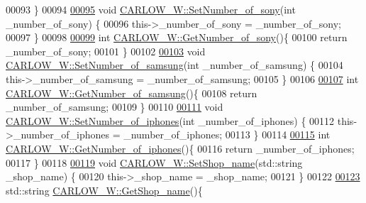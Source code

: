\begin{DoxyCode}
00093 \}
00094 
\hypertarget{_c_a_r_l_o_w___w_8cpp_source.tex_l00095}{}\hyperlink{class_c_a_r_l_o_w___w_ab255132fb2ef5678d00c74f90acdf2dd}{00095} \textcolor{keywordtype}{void} \hyperlink{class_c_a_r_l_o_w___w_ab255132fb2ef5678d00c74f90acdf2dd}{CARLOW\_W::SetNumber\_of\_sony}(\textcolor{keywordtype}{int} \_number\_of\_sony) \{
00096     this->\_number\_of\_sony = \_number\_of\_sony;
00097 \}
00098 
\hypertarget{_c_a_r_l_o_w___w_8cpp_source.tex_l00099}{}\hyperlink{class_c_a_r_l_o_w___w_a6d31219dac9b4d8842e14b7414ed286e}{00099} \textcolor{keywordtype}{int} \hyperlink{class_c_a_r_l_o_w___w_a6d31219dac9b4d8842e14b7414ed286e}{CARLOW\_W::GetNumber\_of\_sony}()\{
00100     \textcolor{keywordflow}{return} \_number\_of\_sony;
00101 \}
00102 
\hypertarget{_c_a_r_l_o_w___w_8cpp_source.tex_l00103}{}\hyperlink{class_c_a_r_l_o_w___w_a6e629d8043c4c4266ecafa9f6a3e6447}{00103} \textcolor{keywordtype}{void} \hyperlink{class_c_a_r_l_o_w___w_a6e629d8043c4c4266ecafa9f6a3e6447}{CARLOW\_W::SetNumber\_of\_samsung}(\textcolor{keywordtype}{int} \_number\_of\_samsung) \{
00104     this->\_number\_of\_samsung = \_number\_of\_samsung;
00105 \}
00106 
\hypertarget{_c_a_r_l_o_w___w_8cpp_source.tex_l00107}{}\hyperlink{class_c_a_r_l_o_w___w_aecc697b6d017d88f2bdbe3cea2bf3496}{00107} \textcolor{keywordtype}{int} \hyperlink{class_c_a_r_l_o_w___w_aecc697b6d017d88f2bdbe3cea2bf3496}{CARLOW\_W::GetNumber\_of\_samsung}()\{
00108     \textcolor{keywordflow}{return} \_number\_of\_samsung;
00109 \}
00110 
\hypertarget{_c_a_r_l_o_w___w_8cpp_source.tex_l00111}{}\hyperlink{class_c_a_r_l_o_w___w_ad58af9d68450f4fc70e0e1ecd4b1b498}{00111} \textcolor{keywordtype}{void} \hyperlink{class_c_a_r_l_o_w___w_ad58af9d68450f4fc70e0e1ecd4b1b498}{CARLOW\_W::SetNumber\_of\_iphones}(\textcolor{keywordtype}{int} \_number\_of\_iphones) \{
00112     this->\_number\_of\_iphones = \_number\_of\_iphones;
00113 \}
00114 
\hypertarget{_c_a_r_l_o_w___w_8cpp_source.tex_l00115}{}\hyperlink{class_c_a_r_l_o_w___w_a50395c707116ea1176743ed98c6b1f76}{00115} \textcolor{keywordtype}{int} \hyperlink{class_c_a_r_l_o_w___w_a50395c707116ea1176743ed98c6b1f76}{CARLOW\_W::GetNumber\_of\_iphones}()\{
00116     \textcolor{keywordflow}{return} \_number\_of\_iphones;
00117 \}
00118 
\hypertarget{_c_a_r_l_o_w___w_8cpp_source.tex_l00119}{}\hyperlink{class_c_a_r_l_o_w___w_a9d0dcf25c0a9eb8be530c27bd2cf8933}{00119} \textcolor{keywordtype}{void} \hyperlink{class_c_a_r_l_o_w___w_a9d0dcf25c0a9eb8be530c27bd2cf8933}{CARLOW\_W::SetShop\_name}(std::string \_shop\_name) \{
00120     this->\_shop\_name = \_shop\_name;
00121 \}
00122 
\hypertarget{_c_a_r_l_o_w___w_8cpp_source.tex_l00123}{}\hyperlink{class_c_a_r_l_o_w___w_a68235a63964645c525620053a33de863}{00123} std::string \hyperlink{class_c_a_r_l_o_w___w_a68235a63964645c525620053a33de863}{CARLOW\_W::GetShop\_name}()\{

\end{DoxyCode}
